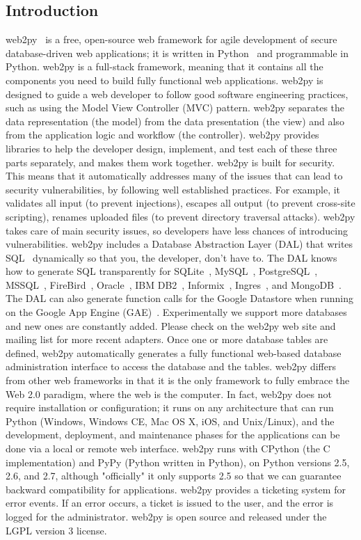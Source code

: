 \documentclass[justified,sixbynine,notoc]{tufte-book}
\begin{document}
\begin{fullwidth}
\goodbreak\chapter{Introduction}
\noindent web2py~\cite{web2py}  is a free, open-source web framework for agile development of secure
database-driven web applications; it is written in Python~\cite{python}
and programmable in Python.
web2py is a full-stack framework,
meaning that it contains all the components you need
to build fully functional web applications.
\noindent web2py is designed to guide a web developer to follow good software engineering practices, such as using
the Model View Controller (MVC) pattern. web2py separates the data representation (the model)
from the data presentation (the view) and also from the application logic and workflow (the controller). web2py
provides libraries to help the developer design, implement, and test each of these three parts separately,
and makes them work together.
\noindent web2py is built for security. This means that it automatically addresses many of the issues
that can lead to security vulnerabilities, by following well established practices. For
example, it validates all input (to prevent injections), escapes all output (to prevent cross-site scripting),
renames uploaded files (to prevent directory traversal attacks).
web2py takes care of main security issues, so developers have less chances of introducing vulnerabilities.
\noindent web2py includes a Database Abstraction Layer (DAL) that writes SQL~\cite{sql-w}  dynamically so that you, the developer, don't have to. The DAL knows how to generate SQL transparently for
SQLite~\cite{sqlite}, MySQL~\cite{mysql}, PostgreSQL~\cite{postgres}, MSSQL~\cite{mssql},
FireBird~\cite{firebird}, Oracle~\cite{oracle}, IBM DB2~\cite{db2}, Informix~\cite{informix},
Ingres~\cite{ingresdb}, and MongoDB~\cite{mongodb}.
The DAL can also generate function calls for the Google Datastore
when running on the Google App Engine (GAE)~\cite{gae}.
Experimentally we support more databases and new ones are constantly added.
Please check on the web2py web site and mailing list for more recent adapters.
Once one or more database tables are defined, web2py automatically generates a fully functional web-based database
administration interface to access the database and the tables.
\noindent web2py differs from other web frameworks in that it is the only framework to fully embrace the Web 2.0
paradigm, where the web is the computer. In fact, web2py does not require installation or configuration; it
runs on any architecture that can run Python (Windows, Windows CE, Mac OS X, iOS, and Unix/Linux), and the development, deployment, and maintenance phases for the applications can be done via a local or remote web interface.  web2py runs with CPython (the C implementation) and PyPy (Python written in Python), on Python versions 2.5, 2.6, and 2.7, although "officially" it only supports 2.5 so that we can guarantee backward compatibility for applications.
\noindent web2py provides a ticketing system for error events. If an error occurs, a ticket is issued to the user,
and the error is logged for the administrator.
\noindent web2py is open source and released under the LGPL version 3 license.


\end{fullwidth}
\end{document}
